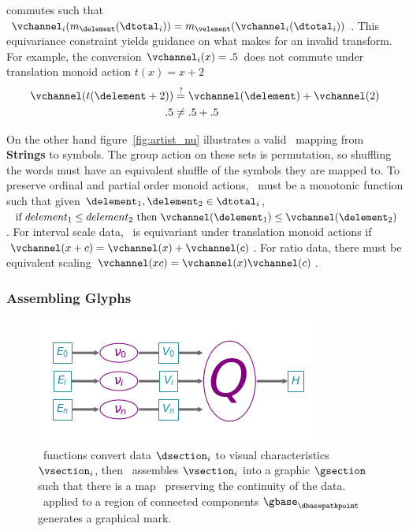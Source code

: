 \documentclass[../main.tex]{subfiles}
\begin{document}
commutes such that $\vchannel_i(m_{\delement}(\dtotal_i)) = m_{\velement}(\vchannel_i(\dtotal_i))$. This equivariance constraint yields guidance on what makes for an invalid transform. For example, the conversion $\vchannel_{i}(x) = .5$ does not commute under translation monoid action $t(x) = x+2$  
\begin{align}
    \vchannel(t(\delement + 2)) & \overset{?}{=} \vchannel(\delement) + \vchannel(2)\\
    .5 &\neq .5 + .5
\end{align}

On the other hand figure~\ref{fig:artist_nu} illustrates a valid \vchannel\ mapping from \textbf{Strings} to symbols. The group action on these sets is permutation, so shuffling the words must have an equivalent shuffle of the symbols they are mapped to. To preserve ordinal and partial order monoid actions, \vchannel\ must be a monotonic function such that given $\delement_1, \delement_2 \in \dtotal_{i}$, $\text{ if } delement_1 \leq delement_2 \text{ then } \vchannel (\delement_1) \leq \vchannel(\delement_2)$. For interval scale data, \vchannel\ is equivariant under translation monoid actions if $\vchannel (x + c) = \vchannel(x) + \vchannel(c)$. For ratio data, there must be equivalent scaling $ \vchannel(xc) = \vchannel(x)\vchannel(c)$.

\subsubsection{Assembling Glyphs \vmark}
\label{sec:artist_q}
\begin{figure}[H]
    \includegraphics[width=\textwidth]{figures/math/path_of_q}
    \caption{\vchannel\ functions convert data $\dsection_i$ to visual characteristics $\vsection_i$, then \vmark\ assembles $\vsection_i$ into a graphic $\gsection$ such that there is a map \vindex\ preserving the continuity of the data. \gsection\ applied to a region of connected components $\gbase_{\dbasepathpoint}$  generates a graphical mark.} 
    \label{fig:artist_q}
\end{figure}
\end{document}
